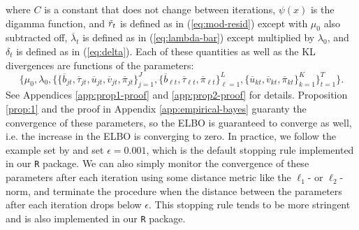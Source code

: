 where $C$ is a constant that does not change between iterations, $\psi(x)$ is the digamma function, and $\Tilde{r}_t$ is defined as in (\ref{eq:mod-resid}) except with $\mu_0$ also subtracted off, $\overline{\lambda}_t$ is defined as in (\ref{eq:lambda-bar}) except multiplied by $\lambda_0$, and $\delta_t$ is defined as in (\ref{eq:delta}). Each of these quantities as well as the KL divergences are functions of the parameters: $$\{\mu_0,\lambda_0,\{\{\overline{b}_{jt}, \overline{\tau}_{jt}, \overline{u}_{jt}, \overline{v}_{jt}, \overline{\pi}_{jt}\}_{j=1}^J, \{\overline{b}_{\ell t}, \overline{\tau}_{\ell t}, \overline{\pi}_{\ell t}\}_{\ell=1}^L, \{\overline{u}_{kt}, \overline{v}_{kt}, \overline{\pi}_{kt}\}_{k=1}^K\}_{t=1}^T\}.$$ See Appendices \ref{app:prop1-proof} and \ref{app:prop2-proof} for details. Proposition \ref{prop:1} and the proof in Appendix \ref{app:empirical-bayes} guaranty the convergence of these parameters, so the ELBO is guaranteed to converge as well, i.e. the increase in the ELBO is converging to zero. In practice, we follow the example set by \cite{Wang20} and set $\epsilon = 0.001$, which is the default stopping rule implemented in our \texttt{R} package. We can also simply monitor the convergence of these parameters after each iteration using some distance metric like the $\ell_1$- or $\ell_2$-norm, and terminate the procedure when the distance between the parameters after each iteration drops below $\epsilon$. This stopping rule tends to be more stringent and is also implemented in our \texttt{R} package.